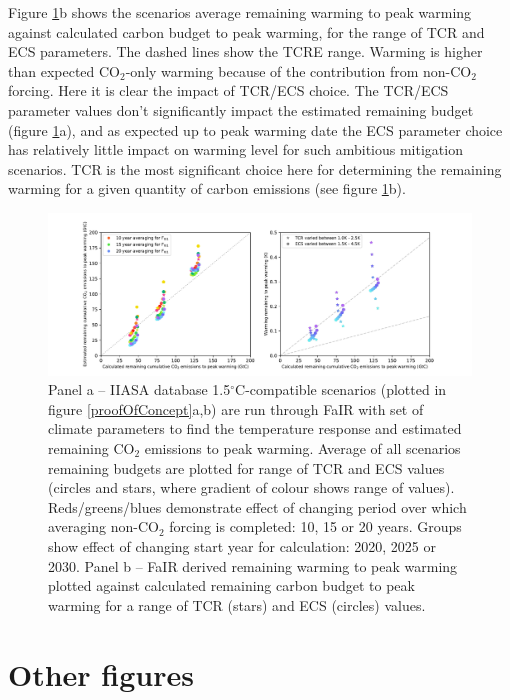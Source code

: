 \documentclass[11pt]{article}
\begin{document}
Figure \ref{paramChoiceEffect}b shows the scenarios average remaining warming to peak warming against calculated carbon budget to peak warming, for the range of TCR and ECS parameters. The dashed lines show the TCRE range. Warming is higher than expected CO$_2$-only warming because of the contribution from non-CO$_2$ forcing. Here it is clear the impact of TCR/ECS choice. The TCR/ECS parameter values don't significantly impact the estimated remaining budget (figure \ref{paramChoiceEffect}a), and as expected up to peak warming date the ECS parameter choice has relatively little impact on warming level for such ambitious mitigation scenarios. TCR is the most significant choice here for determining the remaining warming for a given quantity of carbon emissions (see figure \ref{paramChoiceEffect}b).

\begin{figure}[h]
\begin{centering}
    \includegraphics[scale=0.6]{figures/test_all_multiple_startyrs.pdf}
    \caption{Panel a -- IIASA database 1.5$^{\circ}$C-compatible scenarios (plotted in figure \ref{proofOfConcept}a,b) are run through FaIR with set of climate parameters to find the temperature response and estimated remaining CO$_2$ emissions to peak warming. Average of all scenarios remaining budgets are plotted for range of TCR and ECS values (circles and stars, where gradient of colour shows range of values). Reds/greens/blues demonstrate effect of changing period over which averaging non-CO$_2$ forcing is completed: 10, 15 or 20 years. Groups show effect of changing start year for calculation: 2020, 2025 or 2030. Panel b -- FaIR derived remaining warming to peak warming plotted against calculated remaining carbon budget to peak warming for a range of TCR (stars) and ECS (circles) values.}
    \label{paramChoiceEffect}
\end{centering}
\end{figure}

\newpage

\section{Other figures}
\end{document}
